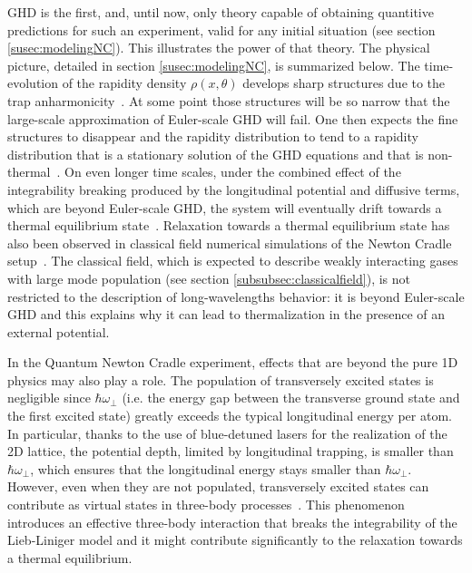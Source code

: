 \documentclass[onecolumn,amsfonts,showpacs,superscriptaddress]{revtex4-1}
\begin{document}
GHD is the first, and, until now, only theory capable of obtaining quantitive predictions for such an experiment, valid for any initial situation (see section \ref{susec:modelingNC}). This illustrates the power of that theory. The physical picture, detailed in section \ref{susec:modelingNC}, is summarized below. The time-evolution of the rapidity density $\rho(x,\theta)$ develops sharp structures due to the trap anharmonicity~\citep{caux2019hydrodynamics}. At some point those structures will be so narrow that the large-scale approximation of Euler-scale GHD will fail. One then expects the fine structures to disappear and the rapidity distribution to tend to a rapidity distribution that is a stationary solution of the GHD equations and that is non-thermal~\citep{caux2019hydrodynamics,cao2018incomplete}. On even longer time scales, under the
combined effect of the integrability breaking produced by the longitudinal potential and diffusive terms, which are beyond Euler-scale GHD, the system will eventually drift towards a thermal equilibrium state~\citep{bastianello_thermalization_2020}.   
Relaxation towards a thermal 
equilibrium state has also been observed in classical field numerical simulations of the Newton Cradle setup~\citep{thomas_thermalization_2021}. 
The classical field, which is expected to describe weakly interacting gases with large mode population (see section \ref{subsubsec:classicalfield}), is not restricted to the description of long-wavelengths behavior: it is beyond Euler-scale GHD and this explains why it can lead to thermalization in the presence of an external potential.

In the Quantum Newton Cradle experiment, effects that are beyond the pure 1D physics may also play a role.  The population of transversely excited states is negligible since $\hbar \omega_\perp$ (i.e. the energy gap between the transverse ground state and the first excited state) greatly exceeds the typical longitudinal energy per atom. In particular, thanks to the use of blue-detuned lasers for the realization of the 2D lattice,  
the potential depth, limited by longitudinal trapping, is smaller than $\hbar \omega_\perp$, which ensures that the longitudinal energy stays smaller than $\hbar \omega_\perp$. However, even when they are not populated, transversely excited states can contribute as virtual states in three-body processes~\citep{mazets_breakdown_2008}. This phenomenon introduces an effective three-body interaction that breaks the integrability of the Lieb-Liniger model and it might contribute significantly to the relaxation towards a thermal equilibrium.
\end{document}
